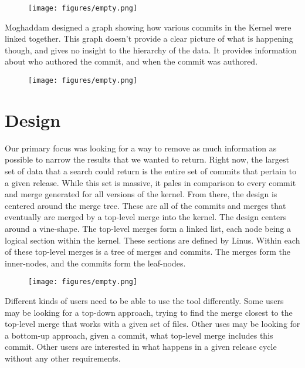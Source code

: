 \documentclass[conference, draftclsnofoot]{IEEEtran}
\begin{document}
\begin{figure}[h!]
	\centering
	\texttt{[image: figures/empty.png]}
	\caption{}
	\label{}
\end{figure}


Moghaddam designed a graph showing how various commits in the Kernel were
linked together. This graph doesn't provide a clear picture of what is
happening though, and gives no insight to the hierarchy of the data. It
provides information about who authored the commit, and when the commit was
authored.

\begin{figure}[h!]
	\centering
	\texttt{[image: figures/empty.png]}
	\caption{}
	\label{}
\end{figure}


\section{Design}

Our primary focus was looking for a way to remove as much information as
possible to narrow the results that we wanted to return. Right now, the largest
set of data that a search could return is the entire set of commits that
pertain to a given release. While this set is massive, it pales in comparison
to every commit and merge generated for all versions of the kernel. From there,
the design is centered around the merge tree. These are all of the commits and
merges that eventually are merged by a top-level merge into the kernel. The
design centers around a vine-shape. The top-level merges form a linked list,
each node being a logical section within the kernel. These sections are defined
by Linus. Within each of these top-level merges is a tree of merges and
commits. The merges form the inner-nodes, and the commits form the leaf-nodes.

\begin{figure}[h!]
	\centering
	\texttt{[image: figures/empty.png]}
	\caption{}
	\label{}
\end{figure}


Different kinds of users need to be able to use the tool differently.
Some users may be looking for a top-down approach, trying to find the merge
closest to the top-level merge that works with a given set of files. Other uses
may be looking for a bottom-up approach, given a commit, what top-level merge
includes this commit. Other users are interested in what happens in a given
release cycle without any other requirements.
\end{document}

